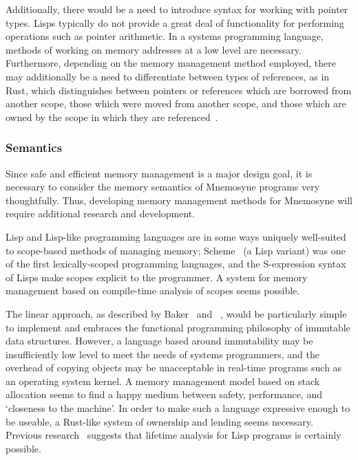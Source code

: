 \documentclass[11pt,a4paper]{article}
\theoremstyle{break}
\begin{document}
Additionally, there would be a need to introduce syntax for working with pointer types. Lisps typically do not provide a great deal of functionality for performing operations such as pointer arithmetic. In a systems programming language, methods of working on memory addresses at a low level are necessary. Furthermore, depending on the memory management method employed, there may additionally be a need to differentiate between types of references, as in Rust, which distinguishes between pointers or references which are borrowed from another scope, those which were moved from another scope, and those which are owned by the scope in which they are referenced~\cite{Matsakis:2014:RL:2663171.2663188}.

\subsubsection{Semantics}

Since safe and efficient memory management is a major design goal, it is necessary to consider the memory semantics of Mnemosyne programs very thoughtfully. Thus, developing memory management methods for Mnemosyne will require additional research and development.

Lisp and Lisp-like programming languages are in some ways uniquely well-suited to scope-based methods of managing memory; Scheme~\cite{r6rs} (a Lisp variant) was one of the first lexically-scoped programming languages, and the S-expression syntax of Lisps make scopes explicit to the programmer. A system for memory management based on compile-time analysis of scopes seems possible.

The linear approach, as described by Baker~\cite{Baker:1992:LLL:142137.142162,Baker:1995:UVL:199818.199860} and \citeauthor{hawblitzel2004low}~\cite{hawblitzel2004low}, would be particularly simple to implement and embraces the functional programming philosophy of immutable data structures. However, a language based around immutability may be insufficiently low level to meet the needs of systems programmers, and the overhead of copying objects may be unacceptable in real-time programs such as an operating system kernel. A memory management model based on stack allocation seems to find a happy medium between safety, performance, and `closeness to the machine'. In order to make such a language expressive enough to be useable, a Rust-like system of ownership and lending seems necessary. Previous research~\cite{sobalvarro1988lifetime} suggests that lifetime analysis for Lisp programs is certainly possible.
\end{document}
